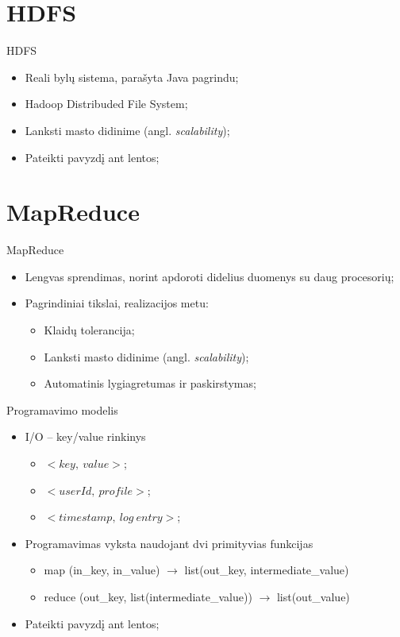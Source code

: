\documentclass{beamer}
\begin{document}
  \section{HDFS}
  \begin{frame}{HDFS}
    \begin{itemize}
      \item Reali bylų sistema, parašyta Java pagrindu;
      \item Hadoop Distribuded File System;
      \item Lanksti masto didinime (angl. \textit{scalability});
      \item Pateikti pavyzdį ant lentos;
    \end{itemize}
  \end{frame}

  \section{MapReduce}
  \begin{frame}{MapReduce}
    \begin{itemize}
      \item Lengvas sprendimas, norint apdoroti didelius duomenys su daug procesorių;
      \item Pagrindiniai tikslai, realizacijos metu:
      \begin{itemize}
        \item Klaidų tolerancija;
        \item Lanksti masto didinime (angl. \textit{scalability});
        \item Automatinis lygiagretumas ir paskirstymas;
      \end{itemize}
    \end{itemize}
  \end{frame}

  \begin{frame}{Programavimo modelis}
    \begin{itemize}
      \item I/O -- key/value rinkinys
      \begin{itemize}
        \item $<key,~value>$;
        \item $<userId,~profile>$;
        \item $<timestamp,~log~entry>$;
      \end{itemize}
      \item Programavimas vyksta naudojant dvi primityvias funkcijas
      \begin{itemize}
        \item map (in\_key, in\_value) $\rightarrow$ list(out\_key, intermediate\_value)
        \item reduce (out\_key, list(intermediate\_value)) $\rightarrow$ list(out\_value)
      \end{itemize}
      \item Pateikti pavyzdį ant lentos;
    \end{itemize}
  \end{frame}
\end{document}
